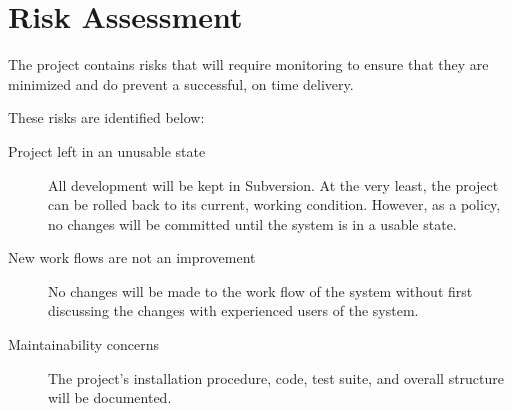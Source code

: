 \documentclass[12pt,titlepage]{article}
\begin{document}
\section{Risk Assessment}
The project contains risks that will require monitoring to ensure that they are minimized and do prevent a successful, on time delivery.

These risks are identified below:
\begin{description}
	\item[Project left in an unusable state] All development will be kept in Subversion.  At the very least, the project can be rolled back to its current, working condition.  However, as a policy, no changes will be committed until the system is in a usable state.
	\item[New work flows are not an improvement] No changes will be made to the work flow of the system without first discussing the changes with experienced users of the system.
	\item[Maintainability concerns] The project's installation procedure, code, test suite, and overall structure will be documented.
\end{description}
\end{document}
